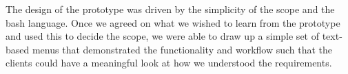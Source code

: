The design of the prototype was driven by the simplicity of the scope and the bash language. Once we agreed on
what we wished to learn from the prototype and used this to decide the scope, we were able to draw up a simple
set of text-based menus that demonstrated the functionality and workflow such that the clients could have a 
meaningful look at how we understood the requirements.